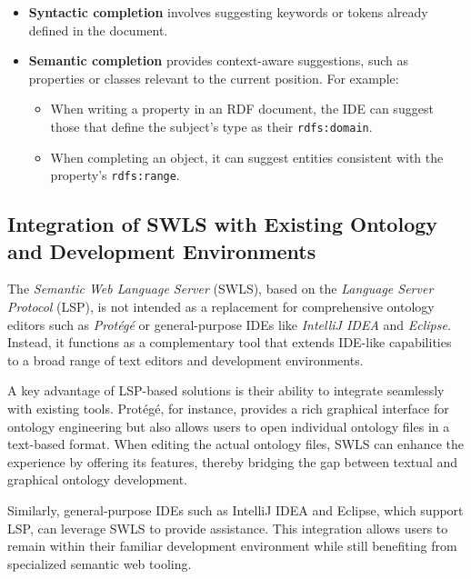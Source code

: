 \begin{itemize}
    \item \textbf{Syntactic completion} involves suggesting keywords or tokens already defined in the document.
    \item \textbf{Semantic completion} provides context-aware suggestions, such as properties or classes relevant to the current position. For example:
    \begin{itemize}
        \item When writing a property in an RDF document, the IDE can suggest those that define the subject's type as their \texttt{rdfs:domain}.
        \item When completing an object, it can suggest entities consistent with the property's \texttt{rdfs:range}.
    \end{itemize}
\end{itemize}


\subsection{Integration of SWLS with Existing Ontology and Development Environments}

The \textit{Semantic Web Language Server} (SWLS), based on the \textit{Language Server Protocol} (LSP), is not intended as a replacement for comprehensive ontology editors such as \textit{Protégé} or general-purpose IDEs like \textit{IntelliJ IDEA} and \textit{Eclipse}.
Instead, it functions as a complementary tool that extends IDE-like capabilities to a broad range of text editors and development environments.

A key advantage of LSP-based solutions is their ability to integrate seamlessly with existing tools.
Protégé, for instance, provides a rich graphical interface for ontology engineering but also allows users to open individual ontology files in a text-based format.
When editing the actual ontology files, SWLS can enhance the experience by offering its features, thereby bridging the gap between textual and graphical ontology development.

Similarly, general-purpose IDEs such as IntelliJ IDEA and Eclipse, which support LSP, can leverage SWLS to provide assistance. 
This integration allows users to remain within their familiar development environment while still benefiting from specialized semantic web tooling.



